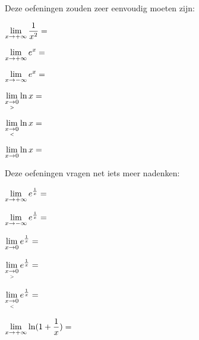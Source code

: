 \documentclass{ximera}
\begin{document}
		Deze oefeningen zouden zeer eenvoudig moeten zijn:
		\begin{exercise} \def\isA{correct}   $\limxi    \frac{1}{x^2}= \;$   \localoefoptions \end{exercise}
		\begin{exercise} \def\isA{correct}   $\limxi    e^x = \;$            \localoefoptions \end{exercise}
		\begin{exercise} \def\isB{correct}   $\limxmi   e^x = \;$            \localoefoptions \end{exercise}
		\begin{exercise} \def\isB{correct}   $\rlimx    \ln x = \;$          \localoefoptions \end{exercise}
		\begin{exercise} \def\isE{correct}   $\llimx    \ln x = \;$          \localoefoptions \end{exercise}
		\begin{exercise} \def\isE{correct}   $\limxz    \ln x = \;$          \localoefoptions \end{exercise}
		Deze oefeningen vragen net iets meer nadenken:				
		\begin{exercise} \def\isD{correct}   $\limxi    e^{\frac 1x} = \;$   \localoefoptions \end{exercise}
		\begin{exercise} \def\isC{correct}   $\limxmi   e^{\frac 1x} = \;$   \localoefoptions \end{exercise}
		\begin{exercise} \def\isE{correct}   $\limxz     e^{\frac 1x} = \;$   \localoefoptions \end{exercise}
		\begin{exercise} \def\isA{correct}   $\rlimx    e^{\frac 1x} = \;$   \localoefoptions \end{exercise}
		\begin{exercise} \def\isC{correct}   $\llimx    e^{\frac 1x} = \;$   \localoefoptions \end{exercise}
		\begin{exercise} \def\isC{correct}   $\limxi    \ln(1+ \frac 1x) = \;$ \localoefoptions \end{exercise}
		
\end{document}
